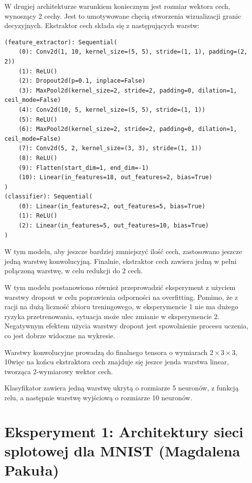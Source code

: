 \documentclass[10pt]{article}
\begin{document}
W drugiej architekturze warunkiem koniecznym jest rozmiar wektora cech, wynoszący 2 cechy.
Jest to umotywowane chęcią stworzenia wizualizacji granic decyzyjnych.
Ekstraktor cech składa się z następujących warstw:
\tiny
\begin{verbatim}
(feature_extractor): Sequential(
    (0): Conv2d(1, 10, kernel_size=(5, 5), stride=(1, 1), padding=(2, 2))
    (1): ReLU()
    (2): Dropout2d(p=0.1, inplace=False)
    (3): MaxPool2d(kernel_size=2, stride=2, padding=0, dilation=1, ceil_mode=False)
    (4): Conv2d(10, 5, kernel_size=(5, 5), stride=(1, 1))
    (5): ReLU()
    (6): MaxPool2d(kernel_size=2, stride=2, padding=0, dilation=1, ceil_mode=False)
    (7): Conv2d(5, 2, kernel_size=(3, 3), stride=(1, 1))
    (8): ReLU()
    (9): Flatten(start_dim=1, end_dim=-1)
    (10): Linear(in_features=18, out_features=2, bias=True)
)
(classifier): Sequential(
    (0): Linear(in_features=2, out_features=5, bias=True)
    (1): ReLU()
    (2): Linear(in_features=5, out_features=10, bias=True)
)
\end{verbatim}
\normalsize

W tym modelu, aby jeszcze bardziej zmniejszyć ilość cech, zastosowano jeszcze jedną warstwę konwolucyjną.
Finalnie, ekstraktor cech zawiera jedną w pełni połączoną warstwę, w celu redukcji do 2 cech.

W tym modelu postanowiono również przeprowadzić eksperyment z użyciem warstwy dropout w celu poprawienia
odporności na overfitting.
Pomimo, że z racji na dużą liczność zbioru treningowego, w eksperymencie 1 nie ma dużego ryzyka przetrenowania,
sytuacja może ulec zmianie w eksperymencie 2. Negatywnym efektem użycia warstwy dropout jest spowolnienie procesu uczenia, co jest dobrze widoczne na wykresie.

Warstwy konwolucyjne prowadzą do finalnego tensora o wymiarach $2 \times 3 \times 3$, 10więc na końcu ekstraktora cech znajduje się jeszce jenda warstwa linear, tworząca 2-wymiarowy wektor cech.

Klasyfikator zawiera jedną warstwę ukrytą o rozmiarze 5 neuronów, z funkcją relu, a następnie warstwę wyjściową o rozmiarze 10 neuronów.

\pagebreak
\section{Eksperyment 1: Architektury sieci splotowej dla MNIST (Magdalena Pakuła)}\label{sec:ex1-pakula_mnist}
\end{document}
